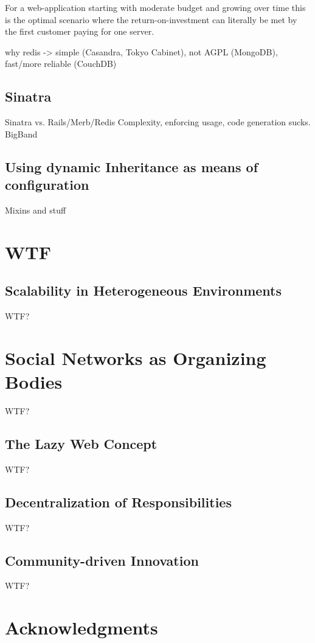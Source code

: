 \documentclass{llncs}
\begin{document}
For a web-application starting with
moderate budget and growing over time this is the optimal scenario where the 
return-on-investment can literally be met by the first customer paying for one 
server.



why redis -> simple (Casandra, Tokyo Cabinet), not AGPL (MongoDB), fast/more reliable (CouchDB)

\subsection{Sinatra}
Sinatra vs. Rails/Merb/Redis
Complexity, enforcing usage, code generation sucks.
BigBand

\subsection{Using dynamic Inheritance as means of configuration}
Mixins and stuff

\section{WTF}

\subsection{Scalability in Heterogeneous Environments}
WTF?

\section{Social Networks as Organizing Bodies}
WTF?

\subsection{The Lazy Web Concept}
WTF?

\subsection{Decentralization of Responsibilities}
WTF?

\subsection{Community-driven Innovation}
WTF?

\section*{Acknowledgments}


\clearpage
\end{document}
